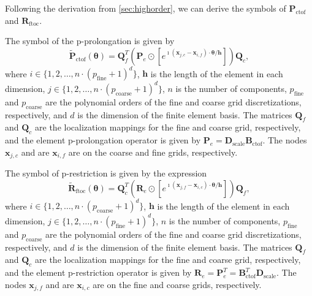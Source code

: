 \documentclass[review]{siamart190516}
\begin{document}
Following the derivation from \cref{sec:highorder}, we can derive the symbols of $\mathbf{P}_{\text{ctof}}$ and $\mathbf{R}_{\text{ftoc}}$.

\begin{definition}\label{def:prolongation_symbol}
The symbol of the p-prolongation is given by
\begin{equation}
\tilde{\mathbf{P}}_{\text{ctof}} \left( \boldsymbol{\theta} \right) = \mathbf{Q}_f^T \left( \mathbf{P}_e \odot \left[ e^{\imath \left( \mathbf{x}_{j, c} - \mathbf{x}_{i, f} \right) \cdot \boldsymbol{\theta} / \mathbf{h}} \right] \right) \mathbf{Q}_c,
\end{equation}
where $i \in \lbrace 1, 2, \dots, n \cdot \left( p_{\text{fine}} + 1 \right)^d \rbrace$, $\mathbf{h}$ is the length of the element in each dimension, $j \in \lbrace 1, 2, \dots, n \cdot \left( p_{\text{coarse}} + 1 \right)^d \rbrace$, $n$ is the number of components, $p_{\text{fine}}$ and $p_{\text{coarse}}$ are the polynomial orders of the fine and coarse grid discretizations, respectively, and $d$ is the dimension of the finite element basis.
The matrices $\mathbf{Q}_f$ and $\mathbf{Q}_c$ are the localization mappings for the fine and coarse grid, respectively, and the element p-prolongation operator is given by $\mathbf{P}_e = \mathbf{D}_{\text{scale}} \mathbf{B}_{\text{ctof}}$.
The nodes $\mathbf{x}_{j, c}$ and are $\mathbf{x}_{i, f}$ are on the coarse and fine grids, respectively.
\end{definition}

\begin{definition}\label{def:restriction_symbol}
The symbol of p-restriction is given by the expression
\begin{equation}
\tilde{\mathbf{R}}_{\text{ftoc}} \left( \boldsymbol{\theta} \right) = \mathbf{Q}_c^T \left( \mathbf{R}_e \odot \left[ e^{\imath \left( \mathbf{x}_{j, f} - \mathbf{x}_{i, c} \right) \cdot \boldsymbol{\theta} / \mathbf{h}} \right] \right) \mathbf{Q}_f,
\end{equation}
where $i \in \lbrace 1, 2, \dots, n \cdot \left( p_{\text{coarse}} + 1 \right)^d \rbrace$, $\mathbf{h}$ is the length of the element in each dimension, $j \in \lbrace 1, 2, \dots, n \cdot \left( p_{\text{fine}} + 1 \right)^d \rbrace$, $n$ is the number of components, $p_{\text{fine}}$ and $p_{\text{coarse}}$ are the polynomial orders of the fine and coarse grid discretizations, respectively, and $d$ is the dimension of the finite element basis.
The matrices $\mathbf{Q}_f$ and $\mathbf{Q}_c$ are the localization mappings for the fine and coarse grid, respectively, and the element p-restriction operator is given by $\mathbf{R}_e = \mathbf{P}_e^T = \mathbf{B}_{\text{ctof}}^T \mathbf{D}_{\text{scale}}$.
The nodes $\mathbf{x}_{j, f}$ and are $\mathbf{x}_{i, c}$ are on the fine and coarse grids, respectively.
\end{definition}
\end{document}
